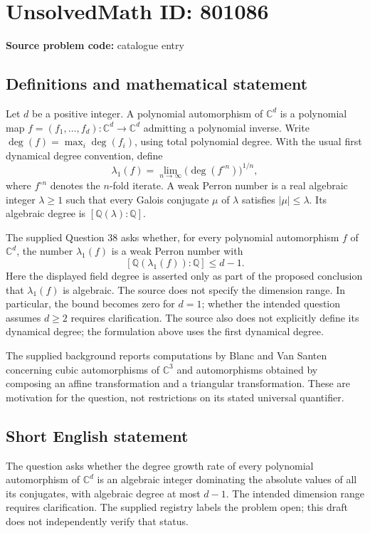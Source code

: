 \documentclass[11pt]{article}
\newcommand{\Q}{\mathbb{Q}}
\newcommand{\C}{\mathbb{C}}
\begin{document}
\section*{UnsolvedMath ID: 801086}
\textbf{Source problem code:} catalogue entry
\subsection{Definitions and mathematical statement}
Let \(d\) be a positive integer. A polynomial automorphism of \(\C^d\) is a polynomial map \(f=(f_1,\ldots,f_d):\C^d\to\C^d\) admitting a polynomial inverse. Write \(\deg(f)=\max_i\deg(f_i)\), using total polynomial degree. With the usual first dynamical degree convention, define
\[
\lambda_1(f)=\lim_{n\to\infty}\bigl(\deg(f^{\circ n})\bigr)^{1/n},
\]
where \(f^{\circ n}\) denotes the \(n\)-fold iterate. A weak Perron number is a real algebraic integer \(\lambda\geq1\) such that every Galois conjugate \(\mu\) of \(\lambda\) satisfies \(|\mu|\leq\lambda\). Its algebraic degree is \([\Q(\lambda):\Q]\).

The supplied Question 38 asks whether, for every polynomial automorphism \(f\) of \(\C^d\), the number \(\lambda_1(f)\) is a weak Perron number with
\[
[\Q(\lambda_1(f)):\Q]\leq d-1.
\]
Here the displayed field degree is asserted only as part of the proposed conclusion that \(\lambda_1(f)\) is algebraic. The source does not specify the dimension range. In particular, the bound becomes zero for \(d=1\); whether the intended question assumes \(d\geq2\) requires clarification. The source also does not explicitly define its dynamical degree; the formulation above uses the first dynamical degree.

The supplied background reports computations by Blanc and Van Santen concerning cubic automorphisms of \(\C^3\) and automorphisms obtained by composing an affine transformation and a triangular transformation. These are motivation for the question, not restrictions on its stated universal quantifier.
\subsection{Short English statement}
The question asks whether the degree growth rate of every polynomial automorphism of \(\C^d\) is an algebraic integer dominating the absolute values of all its conjugates, with algebraic degree at most \(d-1\). The intended dimension range requires clarification. The supplied registry labels the problem open; this draft does not independently verify that status.
\end{document}
